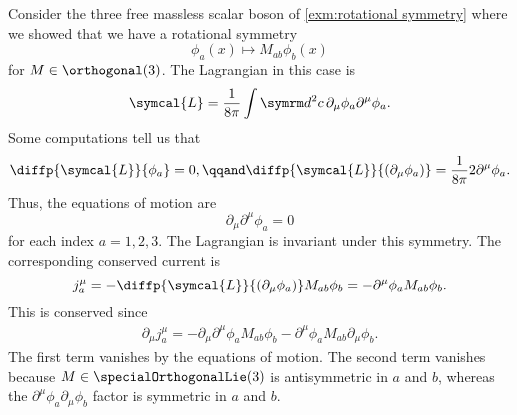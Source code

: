 \documentclass[fleqn]{NotesClass}
\renewcommand{\dl}[1]{\symrm{d}#1}
\newcommand{\lagrangian}{\symcal{L}}
\begin{document}
    \begin{exm}{}{}
        Consider the three free massless scalar boson of \cref{exm:rotational symmetry} where we showed that we have a rotational symmetry
        \begin{equation}
            \phi_a(x) \mapsto M_{ab}\phi_b(x)
        \end{equation}
        for \(M \in \orthogonal(3)\).
        The Lagrangian in this case is
        \begin{equation}
            \lagrangian = \frac{1}{8\pi} \int \dl^2c \, \partial_\mu \phi_a \partial^\mu \phi_a.
        \end{equation}
        Some computations tell us that
        \begin{equation}
            \diffp{\lagrangian}{\phi_a} = 0, \qqand \diffp{\lagrangian}{(\partial_\mu \phi_a)} = \frac{1}{8\pi}2\partial^\mu \phi_a.
        \end{equation}
        Thus, the equations of motion are
        \begin{equation}
            \partial_\mu \partial^\mu \phi_a = 0
        \end{equation}
        for each index \(a = 1, 2, 3\).
        The Lagrangian is invariant under this symmetry.
        The corresponding conserved current is
        \begin{equation}
            j^\mu_a = - \diffp{\lagrangian}{(\partial_\mu \phi_a)} M_{ab}\phi_b = -\partial^\mu \phi_a M_{ab} \phi_b.
        \end{equation}
        This is conserved since
        \begin{align}
            \partial_\mu j^\mu_a = -\partial_\mu \partial^\mu \phi_a M_{ab} \phi_b - \partial^\mu \phi_a M_{ab} \partial_\mu \phi_b.
        \end{align}
        The first term vanishes by the equations of motion.
        The second term vanishes because \(M \in \specialOrthogonalLie(3)\) is antisymmetric in \(a\) and \(b\), whereas the \(\partial^\mu \phi_a \partial_\mu \phi_b\) factor is symmetric in \(a\) and \(b\).
    \end{exm}
    
\end{document}
